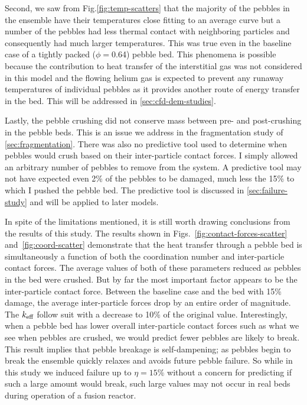 Second, we saw from Fig.\ref{fig:temp-scatters} that the majority of the pebbles in the ensemble have their temperatures close fitting to an average curve but a number of the pebbles had less thermal contact with neighboring particles and consequently had much larger temperatures. This was true even in the baseline case of a tightly packed ($\phi =$\num{0.64}) pebble bed. This phenomena is possible because the contribution to heat transfer of the interstitial gas was not considered in this model and the flowing helium gas is expected to prevent any runaway temperatures of individual pebbles as it provides another route of energy transfer in the bed. This will be addressed in \cref{sec:cfd-dem-studies}.

Lastly, the pebble crushing did not conserve mass between pre- and post-crushing in the pebble beds. This is an issue we address in the fragmentation study of \cref{sec:fragmentation}. There was also no predictive tool used to determine when pebbles would crush based on their inter-particle contact forces. I simply allowed an arbitrary number of pebbles to remove from the system. A predictive tool may not have expected even 2\% of the pebbles to be damaged, much less the 15\% to which I pushed the pebble bed. The predictive tool is discussed in \cref{sec:failure-study} and will be applied to later models.

In spite of the limitations mentioned, it is still worth drawing conclusions from the results of this study. The results shown in Figs.~\ref{fig:contact-forces-scatter} and~\ref{fig:coord-scatter} demonstrate that the heat transfer through a pebble bed is simultaneously a function of both the coordination number and inter-particle contact forces. The average values of both of these parameters reduced as pebbles in the bed were crushed. But by far the most important factor appears to be the inter-particle contact force. Between the baseline case and the bed with 15\% damage, the average inter-particle forces drop by an entire order of magnitude. The $k_\text{eff}$ follow suit with a decrease to 10\% of the original value. Interestingly, when a pebble bed has lower overall inter-particle contact forces such as what we see when pebbles are crushed, we would predict fewer pebbles are likely to break. This result implies that pebble breakage is self-dampening; as pebbles begin to break the ensemble quickly relaxes and avoids future pebble failure. So while in this study we induced failure up to $\eta = 15\%$ without a concern for predicting if such a large amount would break, such large values may not occur in real beds during operation of a fusion reactor. 

